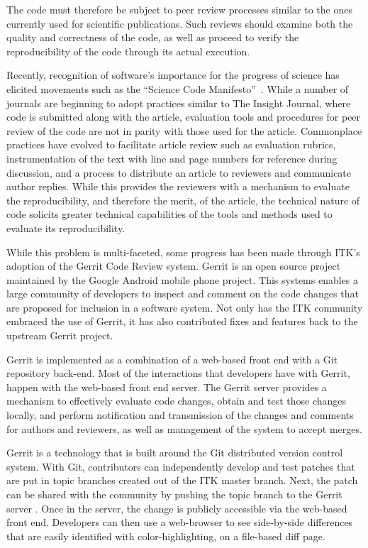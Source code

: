\documentclass{frontiersENG} %
\begin{document}
The code must therefore be subject to peer review processes similar to the ones
currently used for scientific publications. Such reviews should examine both
the quality and correctness of the code, as well as proceed to verify the
reproducibility of the code through its actual execution.

Recently, recognition of software's importance for the progress of science has
elicited movements such as the ``Science Code Manifesto''~\cite{Barnes2011}.
While a number of journals are beginning to adopt practices similar to The
Insight Journal, where code is submitted along with the article, evaluation
tools and procedures for peer review of the code are not in parity with those
used for the article. Commonplace practices have evolved to facilitate article
review such as evaluation rubrics, instrumentation of the text with line and
page numbers for reference during discussion, and a process to distribute an
article to reviewers and communicate author replies.  While this provides the
reviewers with a mechanism to evaluate the reproducibility, and therefore the
merit, of the article, the technical nature of code solicits greater technical
capabilities of the tools and methods used to evaluate its reproducibility.

While this problem is multi-faceted, some progress has been made through ITK’s
adoption of the Gerrit Code Review system.  Gerrit is an open source project
maintained by the Google Android mobile phone project. This systems enables a
large community of developers to inspect and comment on the code changes that
are proposed for inclusion in a software system. Not only has the ITK community
embraced the use of Gerrit, it has also contributed fixes and features back to
the upstream Gerrit project.

Gerrit is implemented as a combination of a web-based front end with a Git
repository back-end. Most of the interactions that developers have with Gerrit,
happen with the web-based front end server. The Gerrit server provides a
mechanism to effectively evaluate code changes, obtain and test those changes
locally, and perform notification and transmission of the changes and comments
for authors and reviewers, as well as management of the system to accept
merges.

Gerrit is a technology that is built around the Git distributed version control
system.  With Git, contributors can independently develop and test patches that
are put in topic branches created out of the ITK master branch.  Next, the
patch can be shared with the community by pushing the topic branch to the
Gerrit server \cite{ITKGerrit}.  Once in the server, the change is publicly
accessible via the web-based front end.  Developers can then use a web-browser
to see side-by-side differences that are easily identified with
color-highlighting, on a file-based diff page.
\end{document}
